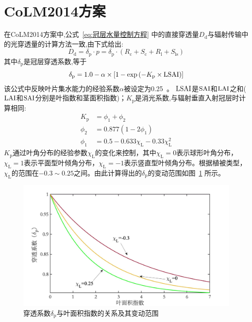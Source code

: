 \section{CoLM2014方案}
在CoLM2014方案中,公式~\eqref{eq:冠层水量控制方程} 中的直接穿透量$D_{\mathrm {d}} $与辐射传输中的光穿透量的计算方法一致,由下式给出:
\begin{equation}
  D_{\mathrm{d}}=\delta_{\mathrm{p}} \cdot p=\delta_{\mathrm{p}} \cdot\left(R_{\mathrm{c}}+S_{\mathrm{c}}+R_{\mathrm{l}}+S_{\mathrm{l s}}\right)
\end{equation}
其中$\delta_{\mathrm {p}} $是冠层穿透系数,等于
\begin{equation}
  \delta_{\mathrm{p}}=1.0-\alpha \times\left[1-\exp \left(-K_{\mathrm{p}} \times {\rm LSAI}\right)\right]
\end{equation}
该公式中反映叶片集水能力的经验系数$\alpha$被设定为0.25~\citep{lawrence2011parameterization}。
${\rm LSAI}$是${\rm SAI}$和${\rm LAI}$之和(${\rm LAI}$和${\rm SAI}$分别是叶指数和茎面积指数)；$K_{\mathrm {p}} $是消光系数,与辐射垂直入射冠层时计算相同:
\begin{equation}\label{eq:消光系数}
  \begin{aligned}
    K_{\mathrm{p}} &= \phi_{1}+\phi_{2} \\
    \phi_{2} &= 0.877\left(1-2 \phi_{1}\right) \\
    \phi_{1} &= 0.5-0.633 \chi_{\mathrm{L}}-0.33 \chi_{\mathrm{L}}^{2}
  \end{aligned}
\end{equation}
$K_{\mathrm {p}} $通过叶角分布的经验参数$\chi_{\mathrm {L}} $的变化来控制，其中$\chi_{\mathrm {L}} =0$表示球形叶角分布，$\chi_{\mathrm {L}} = 1$表示平面型叶倾角分布，$\chi_{\mathrm {L}} = -1$表示竖直型叶倾角分布。根据植被类型，$\chi_{\mathrm {L}} $的范围在$-0.3\sim0.25$之间。由此计算得出的$\delta_{\mathrm {p}} $的变动范围如图~\ref{fig:穿透系数与叶面积指数} 所示。
{
  \begin{figure}[htbp]
    \centering
    \includegraphics[width=1.0\textwidth]{Figures/陆地表面的水分循环/穿透系数与叶面积指数.jpg}
    \caption{穿透系数$\delta_{\mathrm {p}} $与叶面积指数的关系及其变动范围}
    \label{fig:穿透系数与叶面积指数}
  \end{figure}
}

